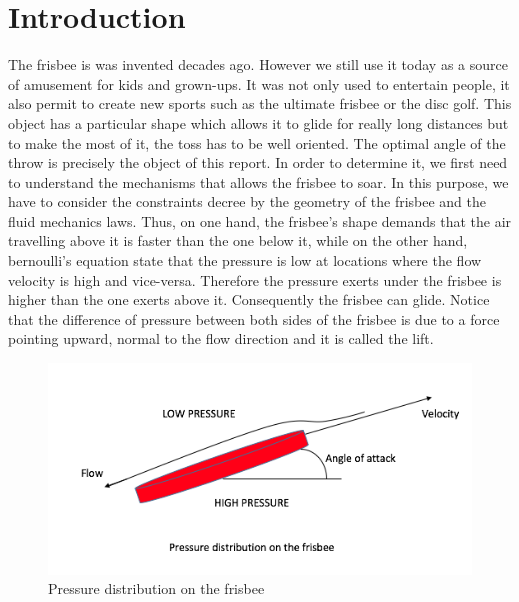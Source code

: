 \documentclass[10pt,a4paper]{report}
\begin{document}
\section{Introduction}
The frisbee is was invented decades ago. However we still use it today as a source of amusement for kids and grown-ups. It was not only used to entertain people, it also permit to create new sports such as the ultimate frisbee or the disc golf. This object has a particular shape which allows it to glide for really long distances but to make the most of it, the toss has to be well oriented. The optimal angle of the throw is precisely the object of this report. In order to determine it, we first need to understand the mechanisms that allows the frisbee to soar. In this purpose, we have to consider the constraints decree by the geometry of the frisbee and the fluid mechanics laws. Thus, on one hand, the frisbee's shape demands that the air travelling above it is faster than the one below it, while on the other hand, bernoulli's equation state that the pressure is low at locations where the flow velocity is high and vice-versa. Therefore the pressure exerts under the frisbee is higher than the one exerts above it. Consequently the frisbee can glide. Notice that the difference of pressure between both sides of the frisbee is due to a force pointing upward, normal to the flow direction and it is called the lift. 

\begin{figure}[H]
\centering
\includegraphics[scale=0.6]{Intro.jpg}
\caption{Pressure distribution on the frisbee}
\label{Pressure distribution on the frisbee}
\end{figure}
\end{document}
